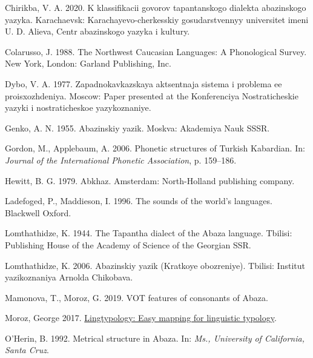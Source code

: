 \documentclass[
]{article}
\newlength{\cslhangindent}
\newlength{\cslentryspacingunit} %
\newenvironment{CSLReferences}[2] %
 {%
  \setlength{\parindent}{0pt}
  \ifodd #1
  \let\oldpar\par
  \def\par{\hangindent=\cslhangindent\oldpar}
  \fi
  \setlength{\parskip}{#2\cslentryspacingunit}
 }%
 {}
\begin{document}
\begin{CSLReferences}{0}{0}
\leavevmode{}%
Chirikba, V. A. 2020. K klassifikacii govorov tapantanskogo dialekta
abazinskogo yazyka. Karachaevsk: Karachayevo-cherkesskiy gosudarstvennyy
universitet imeni U. D. Alieva, Centr abazinskogo yazyka i kultury.

\leavevmode{}%
Colarusso, J. 1988. The {N}orthwest {C}aucasian {L}anguages: A
{P}honological {S}urvey. New York, London: Garland Publishing, Inc.

\leavevmode{}%
Dybo, V. A. 1977. Zapadnokavkazskaya aktsentnaja sistema i problema ee
proisxozhdeniya. Moscow: Paper presented at the Konferenciya
Nostraticheskie yazyki i nostraticheskoe yazykoznaniye.

\leavevmode{}%
Genko, A. N. 1955. Abazinskiy yazik. Moskva: Akademiya Nauk SSSR.

\leavevmode{}%
Gordon, M., Applebaum, A. 2006. Phonetic structures of {T}urkish
{K}abardian. In: \emph{\emph{Journal of the International Phonetic
Association}}, p. 159--186.

\leavevmode{}%
Hewitt, B. G. 1979. Abkhaz. Amsterdam: North-Holland publishing company.

\leavevmode{}%
Ladefoged, P., Maddieson, I. 1996. The sounds of the world's languages.
Blackwell Oxford.

\leavevmode{}%
Lomthathidze, K. 1944. The {T}apantha dialect of the {A}baza language.
Tbilisi: Publishing House of the Academy of Science of the Georgian SSR.

\leavevmode{}%
Lomthathidze, K. 2006. Abazinskiy yazik ({K}ratkoye obozreniye).
Tbilisi: Institut yazikoznaniya Arnolda Chikobava.

\leavevmode{}%
Mamonova, T., Moroz, G. 2019. {VOT} features of consonants of {A}baza.

\leavevmode{}%
Moroz, George 2017.
\href{https://CRAN.R-project.org/package=lingtypology}{Lingtypology:
Easy mapping for linguistic typology}.

\leavevmode{}%
O'Herin, B. 1992. Metrical structure in {A}baza. In: \emph{\emph{Ms.,
University of California, Santa Cruz}}.


\end{CSLReferences}
\end{document}
